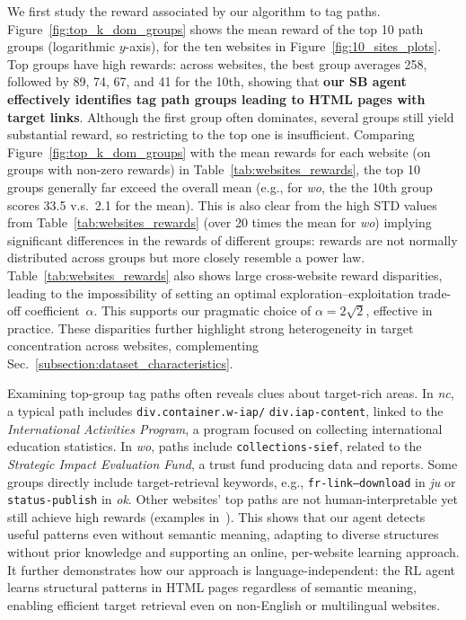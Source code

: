 We first study the reward associated by our algorithm to tag paths.
Figure~\ref{fig:top_k_dom_groups} shows the mean reward of the top 10
path groups (logarithmic $y$-axis), for the ten websites in Figure~\ref{fig:10_sites_plots}.
Top groups have high rewards: across websites, the best group averages 258, followed by 89, 74, 67, and 41 for the 10th, showing that \textbf{our SB agent effectively identifies tag path groups leading to HTML pages with target links}. Although the first group often dominates, several groups still yield substantial reward, so restricting to the top one is insufficient. Comparing Figure~\ref{fig:top_k_dom_groups} with the
mean rewards for each website (on groups with non-zero rewards)
in Table~\ref{tab:websites_rewards}, the top 10 groups
generally far exceed the overall mean
(e.g., for \emph{wo}, the the 10th group scores 33.5 v.s.\
 2.1 for the mean). This is also clear
from the high STD values from Table~\ref{tab:websites_rewards} (over 20 times the mean for \emph{wo})
implying significant differences in the rewards of different
	groups: rewards are not normally distributed across groups but more
closely resemble a power law.
Table~\ref{tab:websites_rewards} also shows large cross-website reward disparities, leading to the impossibility of setting an optimal exploration--exploitation trade-off coefficient~$\alpha$. This supports our pragmatic choice of $\alpha=2\sqrt{2}$, effective in practice. These disparities further highlight strong heterogeneity in target concentration across websites, complementing Sec.~\ref{subsection:dataset_characteristics}.

Examining top-group tag paths often reveals clues about target-rich areas. In \emph{nc}, a typical path includes \texttt{div.container.w-iap/}
\noindent\texttt{div.iap-content}, linked to the \emph{International Activities Program}, a program focused on collecting international education statistics. In \emph{wo}, paths include \texttt{collections-sief}, related to the \emph{Strategic Impact Evaluation Fund}, a trust fund producing data and reports. Some groups directly include target-retrieval keywords, e.g., \texttt{fr-link--download} in \emph{ju} or \texttt{status-publish} in \emph{ok}. Other websites' top paths are not  human-interpretable yet still achieve high rewards (examples in~\cite{github_repository}). This shows that our agent detects useful patterns even without semantic meaning, adapting to diverse structures without prior knowledge and supporting an online, per-website learning approach. 
It further demonstrates how our approach is language-independent: the RL agent learns structural patterns in HTML pages regardless of semantic meaning, enabling efficient target retrieval even on non-English or multilingual websites.

